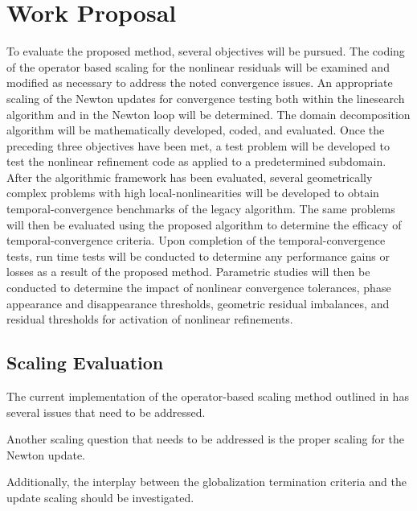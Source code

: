 \chapter{Work Proposal}
\label{chap:proposal}
To evaluate the proposed method, several objectives will be pursued.
The coding of the operator based scaling for the nonlinear residuals will be examined and modified as necessary to address the noted convergence issues.
An appropriate scaling of the Newton updates for convergence testing both within the linesearch algorithm and in the Newton loop will be determined.
The domain decomposition algorithm will be mathematically developed, coded, and evaluated.
Once the preceding three objectives have been met, a test problem will be developed to test the nonlinear refinement code as applied to a predetermined subdomain.
After the algorithmic framework has been evaluated, several geometrically complex problems with high local-nonlinearities will be developed to obtain temporal-convergence benchmarks of the legacy algorithm.
The same problems will then be evaluated using the proposed algorithm to determine the efficacy of temporal-convergence criteria.
Upon completion of the temporal-convergence tests, run time tests will be conducted to determine any performance gains or losses as a result of the proposed method.
Parametric studies will then be conducted to determine the impact of nonlinear convergence tolerances, phase appearance and disappearance thresholds, geometric residual imbalances, and residual thresholds for activation of nonlinear refinements.

\section{Scaling Evaluation}
\label{sect:proposal_scaling}
The current implementation of the operator-based scaling method outlined in  has several issues that need to be addressed.

Another scaling question that needs to be addressed is the proper scaling for the Newton update.

Additionally, the interplay between the globalization termination criteria and the update scaling should be investigated. 

